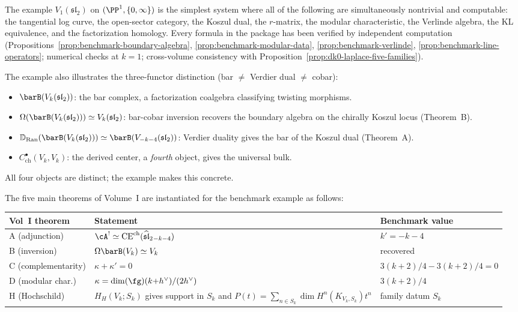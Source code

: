 \begin{remark}
\label{rem:benchmark-consistency}
The example $V_1(\mathfrak{sl}_2)$ on $(\PP^1, \{0,\infty\})$
is the simplest system where all of the following are
simultaneously nontrivial and computable: the tangential log
curve, the open-sector category, the Koszul dual, the $r$-matrix,
the modular characteristic, the Verlinde algebra, the KL
equivalence, and the factorization homology. Every formula in
the package has been verified by independent computation
(Propositions~\ref{prop:benchmark-boundary-algebra},
\ref{prop:benchmark-modular-data},
\ref{prop:benchmark-verlinde},
\ref{prop:benchmark-line-operators};
numerical checks at $k = 1$;
cross-volume consistency with
Proposition~\ref{prop:dk0-laplace-five-families}).

The example also illustrates the three-functor distinction
(bar $\neq$ Verdier dual $\neq$ cobar):
\begin{itemize}[nosep]
\item $\barB(V_k(\mathfrak{sl}_2))$: the bar complex,
 a factorization coalgebra classifying twisting morphisms.
\item $\Omega(\barB(V_k(\mathfrak{sl}_2))) \simeq
 V_k(\mathfrak{sl}_2)$: bar-cobar inversion recovers the
 boundary algebra on the chirally Koszul locus
 \textup{(}Theorem~B\textup{)}.
\item $\mathbb{D}_{\mathrm{Ran}}(\barB(V_k(\mathfrak{sl}_2)))
 \simeq \barB(V_{-k-4}(\mathfrak{sl}_2))$: Verdier duality
 gives the bar of the Koszul dual (Theorem~A).
\item $C^\bullet_{\mathrm{ch}}(V_k, V_k)$: the derived center,
 a \emph{fourth} object, gives the universal bulk.
\end{itemize}
All four objects are distinct; the example makes this concrete.
\end{remark}

\begin{remark}
\label{rem:benchmark-vol1-verification}
The five main theorems of Volume~I are instantiated for the
benchmark example as follows:
\begin{center}
\renewcommand{\arraystretch}{1.2}
\small
\begin{tabular}{lll}
\textbf{Vol~I theorem} & \textbf{Statement}
 & \textbf{Benchmark value} \\
\hline
A (adjunction) & $\cA^! \simeq
 \operatorname{CE}^{\mathrm{ch}}(\widehat{\mathfrak{sl}}_2{}_{-k-4})$ &
 $k' = -k - 4$ \\
B (inversion) & $\Omega \barB(V_k) \simeq V_k$ &
 recovered \\
C (complementarity) & $\kappa + \kappa' = 0$ &
 $3(k{+}2)/4 - 3(k{+}2)/4 = 0$ \\
D (modular char.) & $\kappa = \dim(\fg)(k{+}h^\vee)/(2h^\vee)$
 & $3(k{+}2)/4$ \\
H (Hochschild) & $H_H(V_k;S_k)$ gives support in $S_k$ and
$P(t)=\sum_{n\in S_k}\dim H^n(K_{V_k,S_k})t^n$ &
 family datum $S_k$ \\
\end{tabular}
\end{center}
\end{remark}


